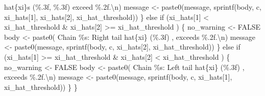 \documentclass[
  letterpaper,
  DIV=11,
  numbers=noendperiod]{scrartcl}
\newenvironment{Shaded}{\begin{snugshade}}{\end{snugshade}}
\newcommand{\CharTok}[1]{\textcolor[rgb]{0.13,0.47,0.30}{#1}}
\newcommand{\ControlFlowTok}[1]{\textcolor[rgb]{0.00,0.23,0.31}{#1}}
\newcommand{\DecValTok}[1]{\textcolor[rgb]{0.68,0.00,0.00}{#1}}
\newcommand{\NormalTok}[1]{\textcolor[rgb]{0.00,0.23,0.31}{#1}}
\newcommand{\OperatorTok}[1]{\textcolor[rgb]{0.37,0.37,0.37}{#1}}
\newcommand{\SpecialCharTok}[1]{\textcolor[rgb]{0.37,0.37,0.37}{#1}}
\newcommand{\StringTok}[1]{\textcolor[rgb]{0.13,0.47,0.30}{#1}}
\begin{document}
\begin{Shaded}
\begin{Highlighting}[]
                     \StringTok{\textquotesingle{}hat}\SpecialCharTok{\{xi\}}\StringTok{s (}\SpecialCharTok{\%.3f}\StringTok{, }\SpecialCharTok{\%.3f}\StringTok{) exceed }\SpecialCharTok{\%.2f}\StringTok{.}\CharTok{\textbackslash{}n}\StringTok{\textquotesingle{}}\NormalTok{)}
\NormalTok{      message }\OperatorTok{\textless{}{-}}\NormalTok{ paste0(message, sprintf(body, c,}
\NormalTok{                                         xi\_hats[}\DecValTok{1}\NormalTok{], xi\_hats[}\DecValTok{2}\NormalTok{],}
\NormalTok{                                         xi\_hat\_threshold))}
\NormalTok{    \} }\ControlFlowTok{else} \ControlFlowTok{if}\NormalTok{ (xi\_hats[}\DecValTok{1}\NormalTok{] }\OperatorTok{\textless{}}\NormalTok{  xi\_hat\_threshold }\OperatorTok{\&}
\NormalTok{               xi\_hats[}\DecValTok{2}\NormalTok{] }\OperatorTok{\textgreater{}=}\NormalTok{ xi\_hat\_threshold   ) \{}
\NormalTok{      no\_warning }\OperatorTok{\textless{}{-}}\NormalTok{ FALSE}
\NormalTok{      body }\OperatorTok{\textless{}{-}}\NormalTok{ paste0(}\StringTok{\textquotesingle{}  Chain }\SpecialCharTok{\%s}\StringTok{: Right tail hat}\SpecialCharTok{\{xi\}}\StringTok{ (}\SpecialCharTok{\%.3f}\StringTok{) \textquotesingle{}}\NormalTok{,}
                     \StringTok{\textquotesingle{}exceeds }\SpecialCharTok{\%.2f}\StringTok{.}\CharTok{\textbackslash{}n}\StringTok{\textquotesingle{}}\NormalTok{)}
\NormalTok{      message }\OperatorTok{\textless{}{-}}\NormalTok{ paste0(message, sprintf(body, c, xi\_hats[}\DecValTok{2}\NormalTok{],}
\NormalTok{                                         xi\_hat\_threshold))}
\NormalTok{    \} }\ControlFlowTok{else} \ControlFlowTok{if}\NormalTok{ (xi\_hats[}\DecValTok{1}\NormalTok{] }\OperatorTok{\textgreater{}=}\NormalTok{ xi\_hat\_threshold }\OperatorTok{\&} 
\NormalTok{               xi\_hats[}\DecValTok{2}\NormalTok{] }\OperatorTok{\textless{}}\NormalTok{  xi\_hat\_threshold   ) \{}
\NormalTok{      no\_warning }\OperatorTok{\textless{}{-}}\NormalTok{ FALSE}
\NormalTok{      body }\OperatorTok{\textless{}{-}}\NormalTok{ paste0(}\StringTok{\textquotesingle{}  Chain }\SpecialCharTok{\%s}\StringTok{: Left tail hat}\SpecialCharTok{\{xi\}}\StringTok{ (}\SpecialCharTok{\%.3f}\StringTok{) \textquotesingle{}}\NormalTok{,}
                     \StringTok{\textquotesingle{}exceeds }\SpecialCharTok{\%.2f}\StringTok{.}\CharTok{\textbackslash{}n}\StringTok{\textquotesingle{}}\NormalTok{)}
\NormalTok{      message }\OperatorTok{\textless{}{-}}\NormalTok{ paste0(message, sprintf(body, c, xi\_hats[}\DecValTok{1}\NormalTok{],}
\NormalTok{                                         xi\_hat\_threshold))}
\NormalTok{    \}}
\NormalTok{  \}}
  

\end{Highlighting}
\end{Shaded}
\end{document}
